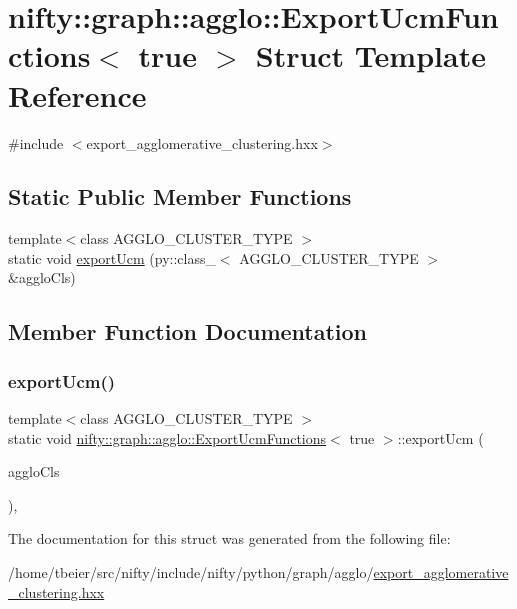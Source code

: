 \hypertarget{structnifty_1_1graph_1_1agglo_1_1ExportUcmFunctions_3_01true_01_4}{}\section{nifty\+:\+:graph\+:\+:agglo\+:\+:Export\+Ucm\+Functions$<$ true $>$ Struct Template Reference}
\label{structnifty_1_1graph_1_1agglo_1_1ExportUcmFunctions_3_01true_01_4}


{\ttfamily \#include $<$export\+\_\+agglomerative\+\_\+clustering.\+hxx$>$}

\subsection*{Static Public Member Functions}
\begin{DoxyCompactItemize}
\item 
{\footnotesize template$<$class A\+G\+G\+L\+O\+\_\+\+C\+L\+U\+S\+T\+E\+R\+\_\+\+T\+Y\+PE $>$ }\\static void \hyperlink{structnifty_1_1graph_1_1agglo_1_1ExportUcmFunctions_3_01true_01_4_ac0089063667bb8b86839ab1c1061fd74}{export\+Ucm} (py\+::class\+\_\+$<$ A\+G\+G\+L\+O\+\_\+\+C\+L\+U\+S\+T\+E\+R\+\_\+\+T\+Y\+PE $>$ \&agglo\+Cls)
\end{DoxyCompactItemize}


\subsection{Member Function Documentation}
\mbox{\label{structnifty_1_1graph_1_1agglo_1_1ExportUcmFunctions_3_01true_01_4_ac0089063667bb8b86839ab1c1061fd74}} 
\subsubsection{\texorpdfstring{export\+Ucm()}{exportUcm()}}
{\footnotesize\ttfamily template$<$class A\+G\+G\+L\+O\+\_\+\+C\+L\+U\+S\+T\+E\+R\+\_\+\+T\+Y\+PE $>$ \\
static void \hyperlink{structnifty_1_1graph_1_1agglo_1_1ExportUcmFunctions}{nifty\+::graph\+::agglo\+::\+Export\+Ucm\+Functions}$<$ true $>$\+::export\+Ucm (\begin{DoxyParamCaption}\item[{py\+::class\+\_\+$<$ A\+G\+G\+L\+O\+\_\+\+C\+L\+U\+S\+T\+E\+R\+\_\+\+T\+Y\+PE $>$ \&}]{agglo\+Cls }\end{DoxyParamCaption})\hspace{0.3cm}{\ttfamily [inline]}, {\ttfamily [static]}}



The documentation for this struct was generated from the following file\+:\begin{DoxyCompactItemize}
\item 
/home/tbeier/src/nifty/include/nifty/python/graph/agglo/\hyperlink{export__agglomerative__clustering_8hxx}{export\+\_\+agglomerative\+\_\+clustering.\+hxx}\end{DoxyCompactItemize}
